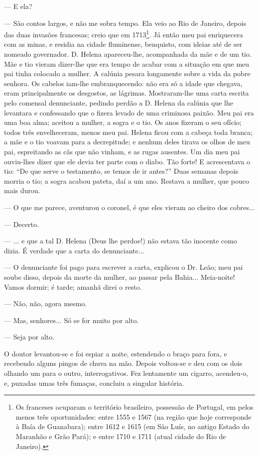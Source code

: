 --- E ela?

--- São contos largos, e não me sobra tempo. Ela veio ao Rio de Janeiro,
depois das duas invasões francesas; creio que em 1713\footnote{Os
  franceses ocuparam o território brasileiro, possessão de Portugal, em
  pelos menos três oportunidades: entre 1555 e 1567 (na região que hoje
  corresponde à Baía de Guanabara); entre 1612 e 1615 (em São Luís, no
  antigo Estado do Maranhão e Grão Pará); e entre 1710 e 1711 (atual
  cidade do Rio de Janeiro).}. Já então meu pai enriquecera com as
minas, e residia na cidade fluminense, benquisto, com ideias até de ser
nomeado governador. D. Helena apareceu-lhe, acompanhada da mãe e de um
tio. Mãe e tio vieram dizer-lhe que era tempo de acabar com a situação
em que meu pai tinha colocado a mulher. A calúnia pesara longamente
sobre a vida da pobre senhora. Os cabelos iam-lhe embranquecendo: não
era só a idade que chegava, eram principalmente os desgostos, as
lágrimas. Mostraram-lhe uma carta escrita pelo comensal denunciante,
pedindo perdão a D. Helena da calúnia que lhe levantara e confessando
que o fizera levado de uma criminosa paixão. Meu pai era uma boa alma;
aceitou a mulher, a sogra e o tio. Os anos fizeram o seu ofício; todos
três envelheceram, menos meu pai. Helena ficou com a cabeça toda branca;
a mãe e o tio voavam para a decrepitude; e nenhum deles tirava os olhos
de meu pai, espreitando as cãs que não vinham, e as rugas ausentes. Um
dia meu pai ouviu-lhes dizer que ele devia ter parte com o diabo. Tão
forte! E acrescentava o tio: ``De que serve o testamento, se temos de ir
antes?'' Duas semanas depois morria o tio; a sogra acabou pateta, daí a
um ano. Restava a mulher, que pouco mais durou.

--- O que me parece, aventurou o coronel, é que eles vieram ao cheiro
dos cobres...

--- Decerto.

--- ... e que a tal D. Helena (Deus lhe perdoe!) não estava tão inocente
como dizia. É verdade que a carta do denunciante...

--- O denunciante foi pago para escrever a carta, explicou o Dr. Leão;
meu pai soube disso, depois da morte da mulher, ao passar pela Bahia...
Meia-noite! Vamos dormir; é tarde; amanhã direi o resto.

--- Não, não, agora mesmo.

--- Mas, senhores... Só se for muito por alto.

--- Seja por alto.

O doutor levantou-se e foi espiar a noite, estendendo o braço para fora,
e recebendo alguns pingos de chuva na mão. Depois voltou-se e deu com os
dois olhando um para o outro, interrogativos. Fez lentamente um cigarro,
acendeu-o, e, puxadas umas três fumaças, concluiu a singular história.

